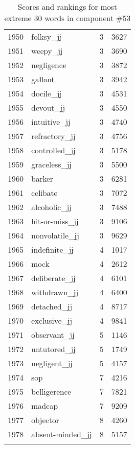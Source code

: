 \begin{longtable}[!htbp]{| rlr@{.}l |}
    1950 & folksy\_jj & 3 & 3627 \\
    1951 & weepy\_jj & 3 & 3690 \\
    1952 & negligence & 3 & 3872 \\
    1953 & gallant & 3 & 3942 \\
    1954 & docile\_jj & 3 & 4531 \\
    1955 & devout\_jj & 3 & 4550 \\
    1956 & intuitive\_jj & 3 & 4740 \\
    1957 & refractory\_jj & 3 & 4756 \\
    1958 & controlled\_jj & 3 & 5178 \\
    1959 & graceless\_jj & 3 & 5500 \\
    1960 & barker & 3 & 6281 \\
    1961 & celibate & 3 & 7072 \\
    1962 & alcoholic\_jj & 3 & 7488 \\
    1963 & hit-or-miss\_jj & 3 & 9106 \\
    1964 & nonvolatile\_jj & 3 & 9629 \\
    1965 & indefinite\_jj & 4 & 1017 \\
    1966 & mock & 4 & 2612 \\
    1967 & deliberate\_jj & 4 & 6101 \\
    1968 & withdrawn\_jj & 4 & 6400 \\
    1969 & detached\_jj & 4 & 8717 \\
    1970 & exclusive\_jj & 4 & 9841 \\
    1971 & observant\_jj & 5 & 1146 \\
    1972 & untutored\_jj & 5 & 1749 \\
    1973 & negligent\_jj & 5 & 4157 \\
    1974 & sop & 7 & 4216 \\
    1975 & belligerence & 7 & 7821 \\
    1976 & madcap & 7 & 9209 \\
    1977 & objector & 8 & 4260 \\
    1978 & absent-minded\_jj & 8 & 5157 \\
    \hline
    \caption{Scores and rankings for most extreme 30 words in component \#53} \\
\end{longtable}
